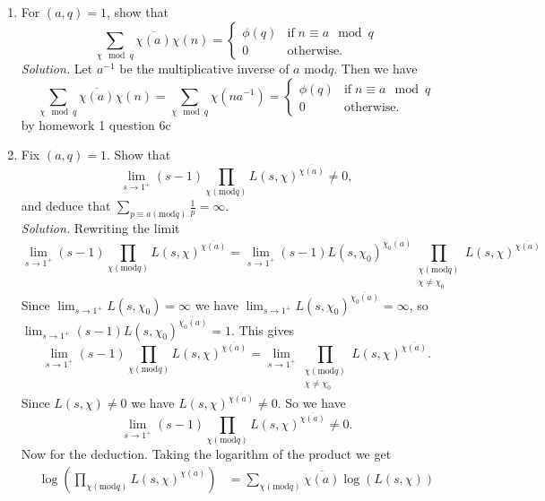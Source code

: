 \documentclass[12pt]{article}
\begin{document}
\begin{enumerate}[label=(\alph*)]
    \[
        \lim_{s\to1^{+}}\exp\left(\phi(q)\sum_{n=1}^\infty\frac{1}{n}\sum_{p^n\equiv 1(\text{mod} q)}\frac{1}{p^{n}}+\log(1-1)\right)=\exp(c'+\log(0))=\exp(-\infty)=0.
    \]
    But we know that the RHS is not 0, so we have that $\sum_{p\equiv 1(\text{mod} q)}\frac{1}{p}=\infty$.
    \item For $(a,q)=1$, show that 
    \[
        \sum_{\chi\mod q}\overline{\chi(a)}\chi(n)=
        \begin{cases}
            \phi(q)&\text{if}\;n\equiv a\mod q\\
            0&\text{otherwise.}
        \end{cases}
    \]
    \textit{Solution.} Let $a^{-1}$ be the multiplicative inverse of $a$ mod$q$. Then we have
    \[
        \sum_{\chi\mod q}\overline{\chi(a)}\chi(n)=\sum_{\chi\mod q}\chi(na^{-1})=
        \begin{cases}
            \phi(q)&\text{if}\;n\equiv a\mod q\\
            0&\text{otherwise.}
        \end{cases}
    \]
    by homework 1 question 6c
    \item  Fix $(a,q)=1$. Show that 
    \[
        \lim_{s\to1^{+}}(s-1)\prod_{\chi(\text{mod} q)}L(s,\chi)^{\overline{\chi(a)}}\neq 0,
    \] and deduce that $\sum_{p\equiv a(\text{mod} q)}\frac{1}{p}=\infty$.\\
    \textit{Solution.} Rewriting the limit
    \[
        \lim_{s\to1^{+}}(s-1)\prod_{\chi(\text{mod} q)}L(s,\chi)^{\overline{\chi(a)}}=\lim_{s\to1^{+}}(s-1)L(s,\chi_0)^{\overline{\chi_0(a)}}\prod_{\substack{\chi(\text{mod}q)\\\chi\neq\chi_0}}L(s,\chi)^{\overline{\chi(a)}}
    \]
    Since $\lim_{s\to1^{+}}L(s,\chi_0)=\infty$ we have $\lim_{s\to1^{+}}L(s,\chi_0)^{\overline{\chi_0(a)}}=\infty$, so $\lim_{s\to1^{+}}(s-1)L(s,\chi_0)^{\overline{\chi_0(a)}}=1$. This gives
    \[
        \lim_{s\to1^{+}}(s-1)\prod_{\chi(\text{mod} q)}L(s,\chi)^{\overline{\chi(a)}}=\lim_{s\to1^{+}}\prod_{\substack{\chi(\text{mod}q)\\\chi\neq\chi_0}}L(s,\chi)^{\overline{\chi(a)}}.
    \]
    Since $L(s,\chi)\neq0$ we have $L(s,\chi)^{\overline{\chi(a)}}\neq0.$ So we have
    \[
        \lim_{s\to1^{+}}(s-1)\prod_{\chi(\text{mod} q)}L(s,\chi)^{\overline{\chi(a)}}\neq 0.
    \]
    Now for the deduction. Taking the logarithm of the product we get
    \begin{align*}
        \log\left(\prod_{\chi(\text{mod} q)}L(s,\chi)^{\overline{\chi(a)}}\right)&=\sum_{\chi(\text{mod} q)}\overline{\chi(a)}\log(L(s,\chi))\\

\end{align*}
\end{enumerate}
\end{document}
